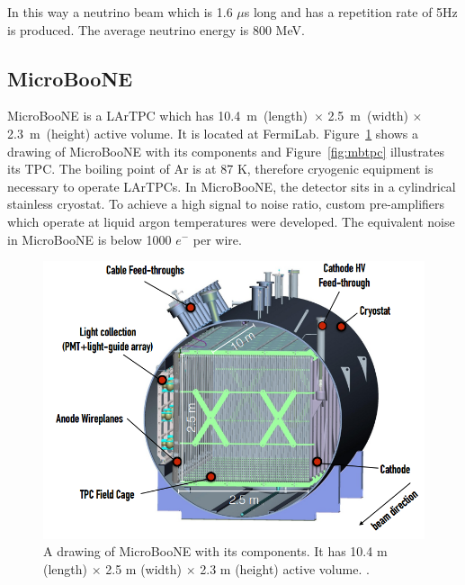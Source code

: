\documentclass[a4paper]{article}\linespread{1.4}
\begin{document}
In this way a neutrino beam which is 1.6 $\mu$s long and has a repetition rate of 5Hz is produced. The average neutrino energy is 800 MeV.

\subsection{MicroBooNE}

MicroBooNE is a LArTPC which has 10.4~m~(length)~$\times$ 2.5~m~(width) $\times$ 2.3~m~(height) active volume. It is located at FermiLab. Figure~\ref{fig:mb} shows a drawing of MicroBooNE with its components and Figure~\ref{fig:mbtpc} illustrates its TPC.
The boiling point of Ar is at 87 K, therefore cryogenic equipment is necessary to operate LArTPCs. In MicroBooNE, the detector sits in a cylindrical stainless cryostat. To achieve a high signal to noise ratio, custom pre-amplifiers which operate at liquid argon temperatures were developed. The equivalent noise in MicroBooNE is below 1000 $e^{-}$ per wire. %
\begin{figure}[h!] \centering \includegraphics[width=120mm,scale=1.0]{mb.png} \caption{A drawing of MicroBooNE with its components. It has 10.4 m (length) $\times$ 2.5 m (width) $\times$ 2.3 m (height) active volume. \cite{PP}.} \label{fig:mb}\end{figure}  
\end{document}
